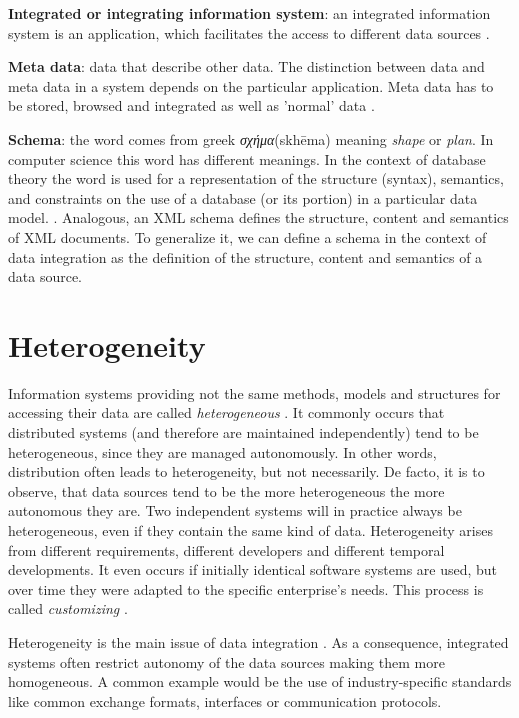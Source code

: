 \textbf{Integrated or integrating information system}:\label{integrated_system_index} an integrated information system is an application, which facilitates the access to different data sources \cite[p. 7]{DBLP:books/dp/LeserN2006}.

\textbf{Meta data}:\label{meta_data_index} data that describe other data. The distinction between data and meta data in a system depends on the particular application. Meta data has to be stored, browsed and integrated as well as 'normal' data \cite[p. 8]{DBLP:books/dp/LeserN2006}.

\textbf{Schema}:\label{schema_index} the word comes from greek \foreignlanguage{greek}{\emph{σχήμα}}(skhēma) meaning \emph{shape} or \emph{plan}. In computer science this word has different meanings. 
In the context of database theory the word is used for a representation of the structure (syntax), semantics, and constraints on the use of a database (or its portion) in a particular data model. \cite[p. 235]{Sheth:1990:FDS:96602.96604}. Analogous, an XML schema defines the structure, content and semantics of XML documents\cite{w3XMLSchema}. To generalize it, we can define a schema in the context of data integration as the definition of the structure, content and semantics of a data source.

\section{Heterogeneity}

Information systems providing not the same methods, models and structures for accessing their data are called \textit{heterogeneous} \cite[p. 58]{DBLP:books/dp/LeserN2006}. It commonly occurs that distributed systems (and therefore are maintained independently) tend to be heterogeneous, since they are managed autonomously. In other words, distribution often leads to heterogeneity, but not necessarily. De facto, it is to observe, that data sources tend to be the more heterogeneous the more autonomous they are. Two independent systems will in practice always  be heterogeneous, even if they contain the same kind of data. Heterogeneity arises from different requirements, different developers and different temporal developments. It even occurs if initially identical software systems are used, but over time they were adapted to the specific enterprise's needs. This process is called \textit{customizing}  \cite[p. 59]{DBLP:books/dp/LeserN2006}. 

Heterogeneity is the main issue of data integration \cite[p. 59]{DBLP:books/dp/LeserN2006}. As a consequence, integrated systems often restrict autonomy of the data sources making them more homogeneous. A common example would be the use of industry-specific standards like common exchange formats, interfaces or communication protocols.

